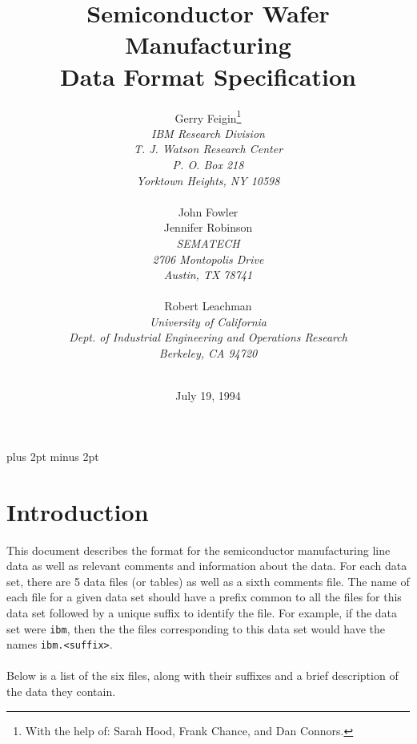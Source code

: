    \batchmode
   \addtolength{\textwidth}{+1.05truein}
   \addtolength{\textheight}{+1.75truein}
   \addtolength{\hoffset}{-0.5truein}
   \addtolength{\voffset}{-0.85truein}
   
   \pagestyle{empty}
   
   
   
   \title{Semiconductor Wafer Manufacturing \\ Data Format Specification}
   
   \author{Gerry Feigin\thanks{With the help of: Sarah Hood, Frank Chance, and
   Dan Connors.}\\
   {\em IBM Research Division} \\
   {\em T. J. Watson Research Center} \\
   {\em P. O.  Box 218}   \\
   {\em Yorktown Heights, NY  10598}\\
   \\
   {John Fowler} \\
   {Jennifer Robinson} \\
   {\em SEMATECH} \\
   {\em 2706 Montopolis Drive} \\
   {\em Austin, TX 78741} \\
   \\
   {Robert Leachman} \\
   {\em University of California} \\
   {\em Dept. of Industrial Engineering and Operations Research} \\
   {\em Berkeley, CA 94720}  \\
   \\
   }
   \date{July 19, 1994}
   \maketitle
   
   
   
   \pagestyle{plain}
   
   \baselineskip 17pt plus 2pt minus 2pt
   
   \section{Introduction}
   This document describes the format for the semiconductor manufacturing
   line data as well as relevant comments and
   information about the data.  For each data set, there are 5 data files
   (or tables) as well as a sixth comments file.
   The name of each file for a given data set
   should have a prefix common to all the files for this data set
   followed by a unique suffix to identify the file.   For example,
   if the data set were \verb+ibm+, then the the files corresponding to this 
   data set would have the names \verb+ibm.<suffix>+.
   \\
   \\
   Below is a list of the
   six files, along with their suffixes and a brief description
   of the data they contain.
   
